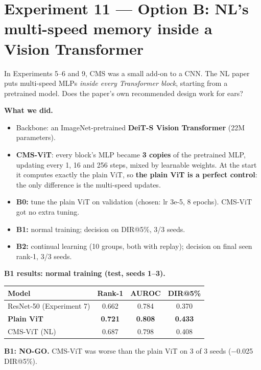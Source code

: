 \documentclass[11pt,a4paper]{article}
\begin{document}
\section{Experiment 11 --- Option B: NL's multi-speed memory inside a Vision Transformer}

\begin{question}
In Experiments 5--6 and 9, CMS was a small add-on to a CNN. The NL paper puts multi-speed MLPs \emph{inside every Transformer block}, starting from a pretrained model. Does the paper's own recommended design work for ears?
\end{question}

\textbf{What we did.}
\begin{itemize}
  \item Backbone: an ImageNet-pretrained \textbf{DeiT-S Vision Transformer} (22M parameters).
  \item \textbf{CMS-ViT}: every block's MLP became \textbf{3 copies} of the pretrained MLP, updating every 1, 16 and 256 steps, mixed by learnable weights. At the start it computes exactly the plain ViT, so \textbf{the plain ViT is a perfect control}: the only difference is the multi-speed updates.
  \item \textbf{B0:} tune the plain ViT on validation (chosen: lr 3e-5, 8 epochs). CMS-ViT got no extra tuning.
  \item \textbf{B1:} normal training; decision on DIR@5\%, 3/3 seeds.
  \item \textbf{B2:} continual learning (10 groups, both with replay); decision on final seen rank-1, 3/3 seeds.
\end{itemize}

\textbf{B1 results: normal training (test, seeds 1--3).}
\begin{center}
\begin{tabular}{@{}lccc@{}}
\toprule
\textbf{Model} & \textbf{Rank-1} & \textbf{AUROC} & \textbf{DIR@5\%}\\
\midrule
ResNet-50 (Experiment 7) & 0.662 & 0.784 & 0.370\\
\textbf{Plain ViT} & \textbf{0.721} & \textbf{0.808} & \textbf{0.433}\\
CMS-ViT (NL) & 0.687 & 0.798 & 0.408\\
\bottomrule
\end{tabular}
\end{center}

\begin{verdict}
\textbf{B1: NO-GO.} CMS-ViT was worse than the plain ViT on 3 of 3 seeds ($-$0.025 DIR@5\%).
\end{verdict}
\end{document}
